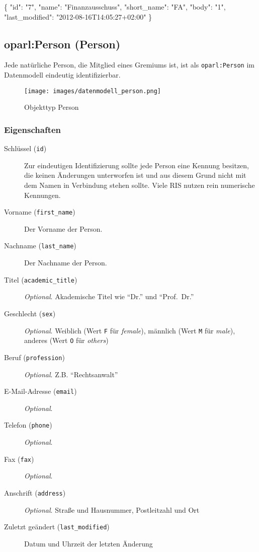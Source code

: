 \documentclass[,a4paper]{article}
\makeatletter
\newenvironment{Shaded}{}{}
\newcommand{\DataTypeTok}[1]{\textcolor[rgb]{0.56,0.13,0.00}{{#1}}}
\newcommand{\StringTok}[1]{\textcolor[rgb]{0.25,0.44,0.63}{{#1}}}
\newcommand{\NormalTok}[1]{{#1}}
\def\maxwidth{\ifdim\Gin@nat@width>\linewidth\linewidth
\else\Gin@nat@width\fi}
\let\Oldincludegraphics\includegraphics
\renewcommand{\includegraphics}[1]{\Oldincludegraphics[width=\maxwidth]{#1}}
\makeatother
\begin{document}
\begin{Shaded}
\begin{Highlighting}[]
\NormalTok{\{}
    \DataTypeTok{"id"}\NormalTok{: }\StringTok{"7"}\NormalTok{,}
    \DataTypeTok{"name"}\NormalTok{: }\StringTok{"Finanzausschuss"}\NormalTok{,}
    \DataTypeTok{"short_name"}\NormalTok{: }\StringTok{"FA"}\NormalTok{,}
    \DataTypeTok{"body"}\NormalTok{: }\StringTok{"1"}\NormalTok{,}
    \DataTypeTok{"last_modified"}\NormalTok{: }\StringTok{"2012-08-16T14:05:27+02:00"}
\NormalTok{\}}
\end{Highlighting}
\end{Shaded}

\subsection{oparl:Person (Person)}

Jede natürliche Person, die Mitglied eines Gremiums ist, ist als
\texttt{oparl:Person} im Datenmodell eindeutig identifizierbar.

\begin{figure}[htbp]
\centering
\texttt{[image: images/datenmodell\_person.png]}
\caption{Objekttyp Person}
\end{figure}

\subsubsection{Eigenschaften}

\begin{description}
\item[Schlüssel (\texttt{id})]
Zur eindeutigen Identifizierung sollte jede Person eine Kennung
besitzen, die keinen Änderungen unterworfen ist und aus diesem Grund
nicht mit dem Namen in Verbindung stehen sollte. Viele RIS nutzen rein
numerische Kennungen.
\item[Vorname (\texttt{first\_name})]
Der Vorname der Person.
\item[Nachname (\texttt{last\_name})]
Der Nachname der Person.
\item[Titel (\texttt{academic\_title})]
\emph{Optional}. Akademische Titel wie ``Dr.'' und ``Prof.~Dr.''
\item[Geschlecht (\texttt{sex})]
\emph{Optional}. Weiblich (Wert \texttt{F} für \emph{female}), männlich
(Wert \texttt{M} für \emph{male}), anderes (Wert \texttt{O} für
\emph{others})
\item[Beruf (\texttt{profession})]
\emph{Optional}. Z.B. ``Rechtsanwalt''
\item[E-Mail-Adresse (\texttt{email})]
\emph{Optional}.
\item[Telefon (\texttt{phone})]
\emph{Optional}.
\item[Fax (\texttt{fax})]
\emph{Optional}.
\item[Anschrift (\texttt{address})]
\emph{Optional}. Straße und Hausnummer, Postleitzahl und Ort
\item[Zuletzt geändert (\texttt{last\_modified})]
Datum und Uhrzeit der letzten Änderung
\end{description}
\end{document}
